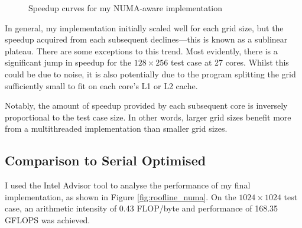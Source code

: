 \documentclass[twocolumn, a4paper]{article}
\begin{document}
\begin{figure}[htpb]
  \caption{Speedup curves for my NUMA-aware implementation}\label{fig:scaling}
\end{figure}

In general, my implementation initially scaled well for each grid size, but the speedup acquired from each subsequent declines---this is known as a sublinear plateau.
There are some exceptions to this trend.
Most evidently, there is a significant jump in speedup for the $128\times256$ test case at 27 cores.
Whilst this could be due to noise, it is also potentially due to the program splitting the grid sufficiently small to fit on each core's L1 or L2 cache.

Notably, the amount of speedup provided by each subsequent core is inversely proportional to the test case size.
In other words, larger grid sizes benefit more from a multithreaded implementation than smaller grid sizes.

\subsection{Comparison to Serial Optimised}

I used the Intel Advisor tool to analyse the performance of my final implementation, as shown in Figure \ref{fig:roofline_numa}.
On the $1024\times1024$ test case, an arithmetic intensity of 0.43 FLOP/byte and performance of 168.35 GFLOPS was achieved.
\end{document}
